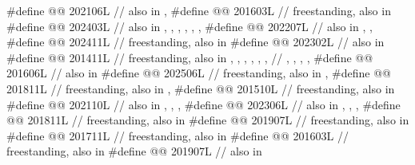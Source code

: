 \begin{codeblock}
#define @@ 202106L // also in , 
#define @@               201603L // freestanding, also in 
#define @@      202403L
  // also in , , , , , , 
#define @@   202207L
  // also in , , 
#define @@                  202411L // freestanding, also in 
#define @@                 202302L // also in 
#define @@  201411L
  // freestanding, also in , , , , , ,
  // , , , , 
#define @@                               201606L // also in 
#define @@                             202506L
  // freestanding, also in , 
#define @@                   201811L
  // freestanding, also in , 
#define @@                          201510L // freestanding, also in 
#define @@ 202110L
  // also in , , , 
#define @@ 202306L
  // also in , , , 
#define @@                    201811L // freestanding, also in 
#define @@                  201907L // freestanding, also in 
#define @@                      201711L // freestanding, also in 
#define @@        201603L // freestanding, also in 
#define @@     201907L // also in 

\end{codeblock}
